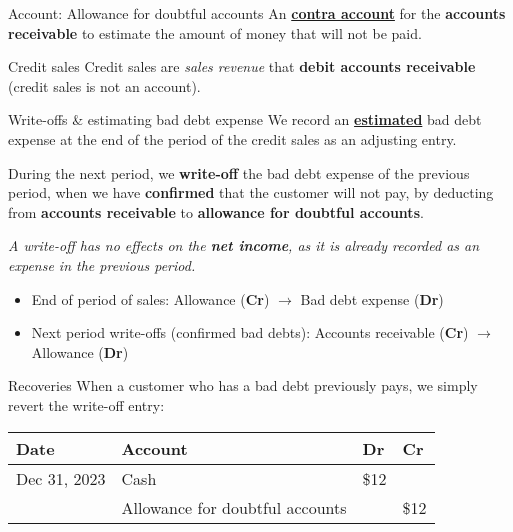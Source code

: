 \begin{definition}
    {Account: Allowance for doubtful accounts}
    An \hyperref[def:contra]{\textbf{contra account}} for the \textbf{accounts receivable} to estimate the amount of money that will not be paid.
\end{definition}

\begin{theorem}
    {Credit sales}
    Credit sales are \textit{sales revenue} that \textbf{debit accounts receivable} (credit sales is not an account).
\end{theorem}

\begin{knBox}
    {Write-offs \& estimating bad debt expense}
    We record an \hyperref[thm:bad_debt_est]{\textbf{estimated}} bad debt expense at the end of the period of the credit sales as an adjusting entry.

    \vspace{0.3em}

    During the next period, we \textbf{write-off} the bad debt expense of the previous period, when we have \textbf{confirmed} that the customer will not pay, by deducting from \textbf{accounts receivable} to \textbf{allowance for doubtful accounts}.

    \vspace{0.3em}

    \textit{A write-off has no effects on the \textbf{net income}, as it is already recorded as an expense in the previous period.}

    \begin{itemize}
        \item End of period of sales: Allowance (\textbf{Cr}) $\rightarrow$ Bad debt expense (\textbf{Dr})
        \item Next period write-offs (confirmed bad debts): Accounts receivable (\textbf{Cr}) $\rightarrow$ Allowance (\textbf{Dr})
    \end{itemize}

\end{knBox}

\begin{knBox}
    {Recoveries}
    When a customer who has a bad debt previously pays, we simply revert the write-off entry:

    \vspace{1em}

    \begin{tabular}{llll}
        \textbf{Date} & \textbf{Account}                      & \textbf{Dr} & \textbf{Cr} \\
        \hline
        Dec 31, 2023  & Cash                                  & \$12        &             \\
                      & \quad Allowance for doubtful accounts &             & \$12        \\
    \end{tabular}
\end{knBox}

